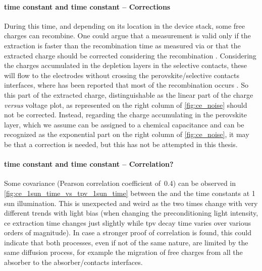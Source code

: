 		\paragraph{ time constant and  time constant -- Corrections}\label{characterization_ce_correction}
		During this time, and depending on its location in the device stack, some free charges can recombine.
		One could argue that a  measurement is valid only if the extraction is faster than the recombination time as measured via  \cite{Ryan2017a} or that the extracted charge should be corrected considering the recombination \cite{Credgington2011,Credgington2014}.
		Considering the charges accumulated in the depletion layers in the selective contacts, these will flow to the electrodes without crossing the perovskite/selective contacts interfaces, where has been reported that most of the recombination occurs \cite{Barnea-Nehoshtan2014,Stolterfoht2018a,Stolterfoht2018}.
		So this part of the extracted charge, distinguishable as the linear part of the charge \textsl{versus} voltage plot, as represented on the right column of \cref{fig:ce_noise} should not be corrected.
		Instead, regarding the charge accumulating in the perovskite layer, which we assume can be assigned to a chemical capacitance and can be recognized as the exponential part on the right column of \cref{fig:ce_noise}, it may be that a correction \cite{Shuttle2008a,Shuttle2008b} is needed, but this has not be attempted in this thesis.

		\paragraph{ time constant and  time constant -- Correlation?}
		Some covariance (Pearson correlation coefficient of~0.4) can be observed in \cref{fig:ce_1sun_time_vs_tpv_1sun_time} between the  and the  time constants at 1 sun illumination.
		This is unexpected and weird as the two times change with very different trends with light bias (when changing the preconditioning light intensity, \gls{ce} extraction time changes just slightly while \gls{tpv} decay time varies over various orders of magnitude).
		In case a stronger proof of correlation is found, this could indicate that both processes, even if not of the same nature, are limited by the same diffusion process, for example the migration of free charges from all the absorber to the absorber/contacts interfaces.

